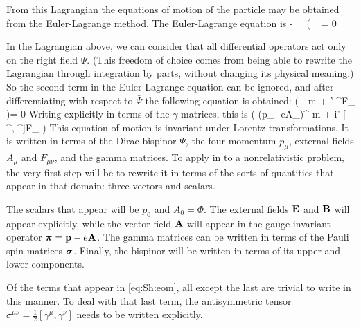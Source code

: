 From this Lagrangian the equations of motion of the particle may be obtained from the Euler-Lagrange method.  The Euler-Lagrange equation is
\beq
{} - \partial_\mu {} {\partial (\partial_\mu {\bar{\Psi})} } 
	= 0	
\eeq

In the Lagrangian above, we can consider that all differential operators act only on the right field $\Psi$.  (This freedom of choice comes from being able to rewrite the Lagrangian through integration by parts, without changing its physical meaning.)  So the second term in the Euler-Lagrange equation can be ignored, and after differentiating with respect to $\bar{\Psi}$ the following equation is obtained:
\beq
	( - m +  \mu'  \sigma^{\mu\nu}F_{\mu\nu} )\Psi = 0	
\eeq
Writing explicitly in terms of the $\gamma$ matrices, this is
\beq \label{eq:Sh:eom}
	\left( (p_\mu- eA_\mu)\gamma^\mu -m + i\mu' [ \gamma^\mu, \gamma^\nu]F_{\mu\nu} \right) 
\eeq
This equation of motion is invariant under Lorentz transformations.  It is written in terms of the Dirac bispinor $\Psi$, the four momentum $p_\mu$, external fields $A_\mu$ and $F_{\mu\nu}$, and the gamma matrices.  To apply in to a nonrelativistic problem, the very first step will be to rewrite it in terms of the sorts of quantities that appear in that domain: three-vectors and scalars.

The scalars that appear will be $p_0$ and $A_0 = \Phi$.  The external fields $\mathbf{E}$ and $\mathbf{B}$ will appear explicitly, while the vector field $\mathbf{A}$ will appear in the gauge-invariant operator $\mbox{\boldmath$ \pi $} = \mathbf{p} - e\mathbf{A}$.  The gamma matrices can be written in terms of the Pauli spin matrices $\mbox{\boldmath$ \sigma $}$.  Finally, the bispinor will be written in terms of its upper and lower components.

Of the terms that appear in \eqref{eq:Sh:eom}, all except the last are trivial to write in this manner.  To deal with that last term, the antisymmetric tensor $\sigma^{\mu\nu} =  \frac{1}{2}[\gamma^\mu, \gamma^\nu]$ needs to be written explicitly.

